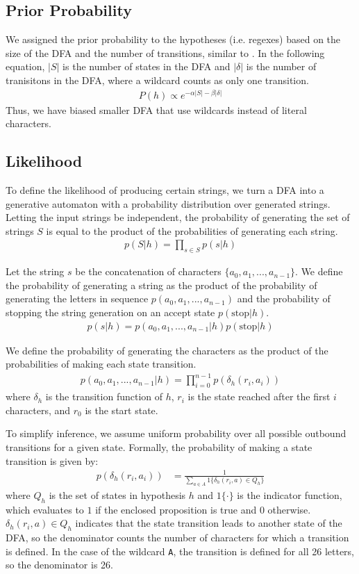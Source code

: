\documentclass[10pt,letterpaper]{article}
\begin{document}
\subsection{Prior Probability}
We assigned the prior probability to the hypotheses (i.e. regexes) based on the size of the DFA and the number of transitions, similar to . In the following equation, $|S|$ is the number of states in the DFA and $|\delta|$ is the number of tranisitons in the DFA, where a wildcard counts as only one transition. 
\begin{align*}
	P(h) \propto e^{-\alpha|S| - \beta|\delta|}
\end{align*}
Thus, we have biased smaller DFA that use wildcards instead of literal characters.

\subsection{Likelihood}
To define the likelihood of producing certain strings, we turn a DFA into a generative automaton with a probability distribution over generated strings. Letting the input strings be independent, the probability of generating the set of strings $S$ is equal to the product of the probabilities of generating each string.
\begin{align*}
	p(S|h) = \prod_{s \in S} p(s|h)
\end{align*}

Let the string $s$ be the concatenation of characters $\{a_0,a_1,...,a_{n-1}\}$. We define the probability of generating a string as the product of the probability of generating the letters in sequence $p(a_0,a_1,...,a_{n-1})$ and the probability of stopping the string generation on an accept state $p(\text{stop}|h)$.
\begin{align*}
	p(s|h) = p(a_0,a_1,...,a_{n-1}|h)p(\text{stop}|h)
\end{align*}

We define the probability of generating the characters as the product of the probabilities of making each state transition.
\begin{align*}
	p(a_0, a_1, ..., a_{n-1}|h) = \prod_{i=0}^{n-1}p(\delta_h(r_i, a_i))
\end{align*}
where $\delta_h$ is the transition function of $h$, $r_i$ is the state reached after the first $i$ characters, and $r_0$ is the start state.


To simplify inference, we assume uniform probability over all possible outbound transitions for a given state. Formally, the probability of making a state transition is given by:
\begin{align*}
	p(\delta_h(r_i, a_i)) &= \frac{1}{\sum_{a\in A} 1\{\delta_h(r_i, a)\in Q_h\}}
\end{align*}
where $Q_h$ is the set of states in hypothesis $h$ and $1\{\cdot\}$ is the indicator function, which evaluates to $1$ if the enclosed proposition is true and $0$ otherwise. $\delta_h(r_i, a)\in Q_h$ indicates that the state transition leads to another state of the DFA, so the denominator counts the number of characters for which a transition is defined. In the case of the wildcard \verb!A!, the transition is defined for all 26 letters, so the denominator is 26.
\end{document}
